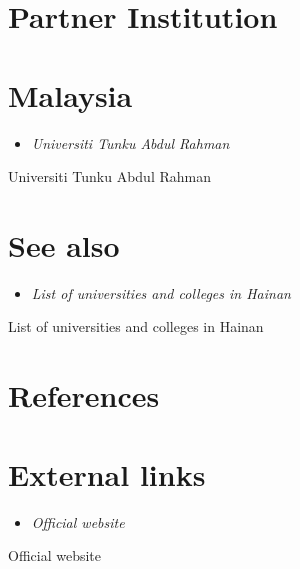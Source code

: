 \section{Partner Institution}\label{partner-institution}

\section{Malaysia}\label{malaysia}

\begin{itemize}
\item
  \emph{Universiti Tunku Abdul Rahman}
\end{itemize}

Universiti Tunku Abdul Rahman

\section{See also}\label{see-also}

\begin{itemize}
\item
  \emph{List of universities and colleges in Hainan}
\end{itemize}

List of universities and colleges in Hainan

\section{References}\label{references}

\section{External links}\label{external-links}

\begin{itemize}
\item
  \emph{Official website}
\end{itemize}

Official website
